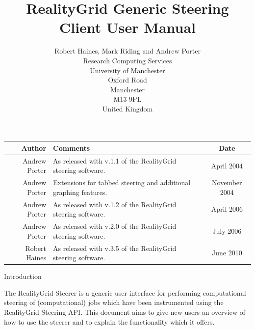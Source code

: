 \documentclass[a4paper,twoside]{article}
\begin{document}
\title{RealityGrid Generic Steering Client User Manual}
\author{Robert Haines, Mark Riding and Andrew Porter
\\Research Computing Services
\\University of Manchester
\\Oxford Road
\\Manchester
\\M13 9PL
\\United Kingdom}
\date{}

\maketitle

\begin{table}
\begin{center}
\begin{tabular}{r|p{8cm}|c}
\hline\hline
Author & Comments & Date \\
\hline
Andrew Porter & As released with v.1.1 of the RealityGrid steering software. & April 2004 \\
Andrew Porter & Extensions for tabbed steering and additional graphing features. & November 2004 \\
Andrew Porter & As released with v.1.2 of the RealityGrid steering software. & April 2006\\
Andrew Porter & As released with v.2.0 of the RealityGrid steering software. & July 2006\\
Robert Haines & As released with v.3.5 of the RealityGrid steering software. & June 2010\\
\hline\hline
\end{tabular}
\end{center}
\end{table}

\pagebreak

\tableofcontents

\pagebreak

\begin{section}{Introduction}

The RealityGrid Steerer is a generic user interface for performing
computational steering of (computational) jobs which have been
instrumented using the RealityGrid Steering API. This document aims to
give new users an overview of how to use the steerer and to explain
the functionality which it offers.

\end{section}

\end{document}
